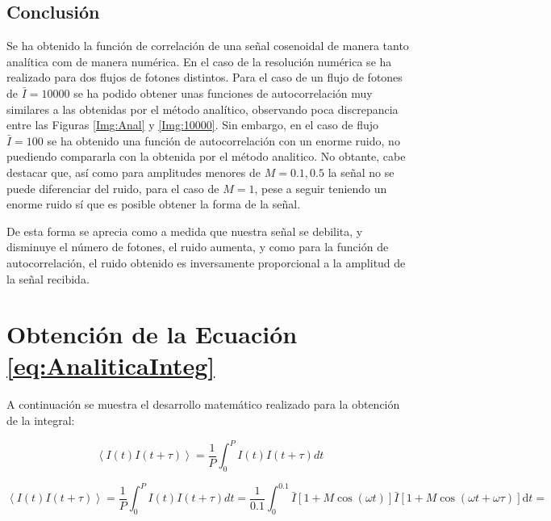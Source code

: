 \documentclass[twoside]{article}
\begin{document}
\begin{multicols}{2}
		\section{Conclusión}

			Se ha obtenido la función de correlación de una señal cosenoidal de manera tanto analítica com de manera numérica. En el caso de la resolución numérica se ha realizado para dos flujos de fotones distintos. Para el caso de un flujo de fotones de $\bar{I} = 10000$ se ha podido obtener unas funciones de autocorrelación muy similares a las obtenidas por el método analítico, observando poca discrepancia entre las Figuras \ref{Img:Anal} y \ref{Img:10000}. Sin embargo, en el caso de flujo $\bar{I} = 100$ se ha obtenido una función de autocorrelación con un enorme ruido, no puediendo compararla con la obtenida por el método analitico. No obtante, cabe destacar que, así como para amplitudes menores de $M= 0.1, 0.5$ la señal no se puede diferenciar del ruido, para el caso de $M=1$, pese a seguir teniendo un enorme ruido sí que es posible obtener la forma de la señal.

			De esta forma se aprecia como a medida que nuestra señal se debilita, y disminuye el número de fotones, el ruido aumenta, y como para la función de autocorrelación, el ruido obtenido es inversamente proporcional a la amplitud de la señal recibida.

	\end{multicols}


\newpage

	    \appendix

	    	\section{Obtención de la Ecuación \ref{eq:AnaliticaInteg}}
	    		\label{appen:1}

	    		A continuación se muestra el desarrollo matemático realizado para la obtención de la integral:

	    		 \[\left< I(t)I(t+\tau)\right> = \frac{1}{P} \int^{P}_0 I(t)I(t+\tau) dt\]
	    		

	    		\[
		    			\left< I(t)I(t+\tau)\right> = \frac{1}{P} \int^{P}_0 I(t)I(t+\tau) dt = \frac {1}{0.1} \int^{0.1}_0 \bar{I}[1+M\cos(\omega t)]\bar{I}[1+M\cos(\omega t + \omega\tau)] \mathrm{d}t =
		    	\]
\end{document}
